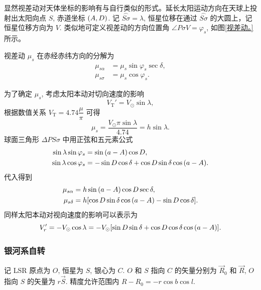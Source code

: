\documentclass[UTF8, 12pt, a4paper, oneside, onecolumn, fontset=none]{ctexart}
\begin{document}
显然视差动对天体坐标的影响有与自行类似的形式。延长太阳运动方向在天球上投射出太阳向点 $S$, 赤道坐标 $\mleft(A, D\mright)$. 记 $\overset{\frown}{S\sigma}=\lambda$, 恒星位移在通过 $\overset{\frown}{S\sigma}$ 的大圆上，记恒星位移方向为 $V$. 类似地可定义视差动的方向位置角 $\angle{P\sigma V}=\varphi_{s}$, 如图\ref{视差动。}所示。

视差动 $\mu_{s}$ 在赤经赤纬方向的分解为
\begin{align}
\mu_{s\alpha}&=\mu_{s}\sin{\varphi_{s}}\sec{\delta},\\
\mu_{s\sigma}&=\mu_{s}\cos{\varphi_{s}}.
\end{align}

为了确定 $\mu_{s}$, 考虑太阳本动对切向速度的影响
\begin{equation}
V_{\mathrm{T}}'=V_{\odot}\sin{\lambda},
\end{equation}
根据数值关系 $V_{\mathrm{T}}=4.74\dfrac{\mu}{\pi}$ 可得
\begin{equation}
\mu_{s}=\frac{V_{\odot}\pi\sin{\lambda}}{4.74}=h\sin{\lambda}.
\end{equation}
球面三角形 $\Delta{}PS\sigma$ 中用正弦和五元素公式
\begin{align}
\sin{\lambda}\sin{\varphi_{s}}&=\sin{\mleft(a-A\mright)}\cos{D},\\
\sin{\lambda}\cos{\varphi_{s}}&=-\sin{D}\cos{\delta}+\cos{D}\sin{\delta}\cos{\mleft(a-A\mright)}.
\end{align}
代入得到
\begin{align}
\mu_{s\alpha}&=h\sin{\mleft(a-A\mright)}\cos{D}\sec{\delta},\\
\mu_{s\delta}&=h\mleft[\cos{D}\sin{\delta}\cos{\mleft(a-A\mright)}-\sin{D}\cos{\delta}\mright].
\end{align}
同样太阳本动对视向速度的影响可以表示为
\begin{equation}
V_{r}'=-V_{\odot}\cos{\lambda}=-V_{\odot}\mleft[\sin{D}\sin{\delta}+\cos{D}\cos{\delta}\cos{\mleft(a-A\mright)}\mright].
\end{equation}

\subsubsection{银河系自转}
记 LSR 原点为 $O$, 恒星为 $S$, 银心为 $C$. $O$ 和 $S$ 指向 $C$ 的矢量分别为 $\vec{R}_{0}$ 和 $\vec{R}$, $O$ 指向 $S$ 的矢量为 $r\vec{S}$. 精度允许范围内 $R-R_{0}=-r\cos{b}\cos{l}$.
\end{document}
